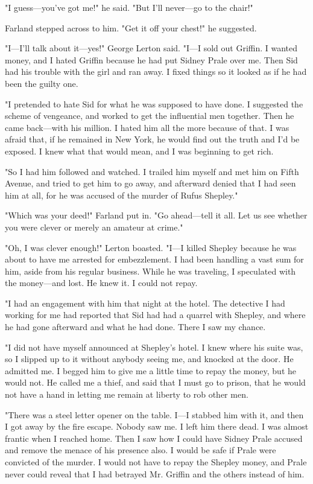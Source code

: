 \documentclass{novel}
\begin{document}
"I guess---you've got me!" he said. "But I'll never---go to the chair!"

Farland stepped across to him. "Get it off your chest!" he suggested.

"I---I'll talk about it---yes!" George Lerton said. "I---I sold out Griffin. I wanted money, and I hated Griffin because he had put Sidney Prale over me. Then Sid had his trouble with the girl and ran away. I fixed things so it looked as if he had been the guilty one.

"I pretended to hate Sid for what he was supposed to have done. I suggested the scheme of vengeance, and worked to get the influential men together. Then he came back---with his million. I hated him all the more because of that. I was afraid that, if he remained in New York, he would find out the truth and I'd be exposed. I knew what that would mean, and I was beginning to get rich.

"So I had him followed and watched. I trailed him myself and met him on Fifth Avenue, and tried to get him to go away, and afterward denied that I had seen him at all, for he was accused of the murder of Rufus Shepley."

"Which was your deed!" Farland put in. "Go ahead---tell it all. Let us see whether you were clever or merely an amateur at crime."

"Oh, I was clever enough!" Lerton boasted. "I---I killed Shepley because he was about to have me arrested for embezzlement. I had been handling a vast sum for him, aside from his regular business. While he was traveling, I speculated with the money---and lost. He knew it. I could not repay.

"I had an engagement with him that night at the hotel. The detective I had working for me had reported that Sid had had a quarrel with Shepley, and where he had gone afterward and what he had done. There I saw my chance.

"I did not have myself announced at Shepley's hotel. I knew where his suite was, so I slipped up to it without anybody seeing me, and knocked at the door. He admitted me. I begged him to give me a little time to repay the money, but he would not. He called me a thief, and said that I must go to prison, that he would not have a hand in letting me remain at liberty to rob other men.

"There was a steel letter opener on the table. I---I stabbed him with it, and then I got away by the fire escape. Nobody saw me. I left him there dead. I was almost frantic when I reached home. Then I saw how I could have Sidney Prale accused and remove the menace of his presence also. I would be safe if Prale were convicted of the murder. I would not have to repay the Shepley money, and Prale never could reveal that I had betrayed Mr. Griffin and the others instead of him.
\end{document}
